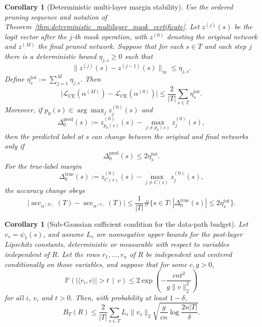 \documentclass[11pt]{article}
\theoremstyle{plain}
\newtheorem{cor}[thm]{Corollary}
\theoremstyle{definition}
\theoremstyle{remark}
\newcommand{\PP}{\mathbb{P}}
\newcommand{\acc}{\operatorname{acc}}
\newcommand{\1}{\mathbf{1}}
\begin{document}
\begin{cor}[Deterministic multi-layer margin stability]
\label{cor:deterministic_multilayer_margin_stability}
Use the ordered pruning sequence and notation of Theorem~\ref{thm:deterministic_multilayer_mask_certificate}. Let \(z^{(j)}(s)\) be the logit vector after the \(j\)-th mask operation, with \(z^{(0)}\) denoting the original network and \(z^{(M)}\) the final pruned network. Suppose that for each \(s\in T\) and each step \(j\) there is a deterministic bound \(\eta_{j,s}\ge0\) such that
\[
\|z^{(j)}(s)-z^{(j-1)}(s)\|_\infty\le \eta_{j,s}.
\]
Define \(\eta_s^{\mathrm{tot}}:=\sum_{j=1}^M\eta_{j,s}\). Then
\[
\big|\mathcal L_{\mathrm{CE}}(\alpha^{(M)})-\mathcal L_{\mathrm{CE}}(\alpha^{(0)})\big|
\le
\frac{2}{|T|}\sum_{s\in T}\eta_s^{\mathrm{tot}}.
\]
Moreover, if \(p_0(s)\in\arg\max_j z^{(0)}_j(s)\) and
\[
\Delta_0^{\mathrm{pred}}(s):=
z_{p_0(s)}^{(0)}(s)-\max_{j\ne p_0(s)}z_j^{(0)}(s),
\]
then the predicted label at \(s\) can change between the original and final networks only if
\[
\Delta_0^{\mathrm{pred}}(s)\le2\eta_s^{\mathrm{tot}}.
\]
For the true-label margin
\[
\Delta_0^{\mathrm{true}}(s):=
z_{C(s)}^{(0)}(s)-\max_{j\ne C(s)}z_j^{(0)}(s),
\]
the accuracy change obeys
\[
\big|\acc_{\alpha^{(M)}}(T)-\acc_{\alpha^{(0)}}(T)\big|
\le
\frac1{|T|}
\#\{s\in T:|\Delta_0^{\mathrm{true}}(s)|\le2\eta_s^{\mathrm{tot}}\}.
\]
\end{cor}

\begin{cor}[Sub-Gaussian sufficient condition for the data-path budget]
\label{cor:subgaussian_data_path_budget}
Let \(v_s=\psi_1(s)\), and assume \(L_s\) are nonnegative upper bounds for the post-layer Lipschitz constants, deterministic or measurable with respect to variables independent of \(R\). Let the rows \(r_1,\dots,r_n\) of \(R\) be independent and centered conditionally on those variables, and suppose that for some \(c,g>0\),
\[
\PP\!\left(
|\langle r_i,v\rangle|>t\,\middle|\,v
\right)
\le
2\exp\!\left(
-\frac{c n t^2}{g\|v\|_2^2}
\right)
\]
for all \(i\), \(v\), and \(t>0\). Then, with probability at least \(1-\delta\),
\[
B_T(R)
\le
\frac2{|T|}
\sum_{s\in T}
L_s\|v_s\|_2
\sqrt{
\frac{g}{c n}\log\frac{2n|T|}{\delta}
}.
\]
\end{cor}
\end{document}
